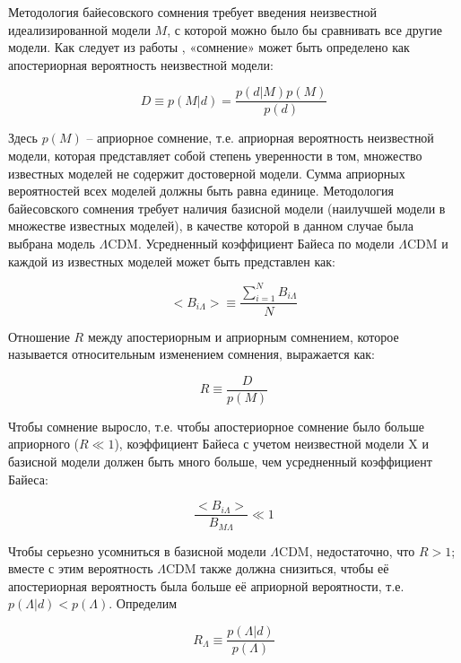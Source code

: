 Методология байесовского сомнения требует введения неизвестной идеализированной модели $M$, с которой можно было бы 
сравнивать все другие модели. Как следует из работы \cite{starkman2008introducing}, «сомнение» может быть определено 
как апостериорная вероятность неизвестной модели:

\begin{equation}
 D \equiv p(M|d) = \frac{p(d|M)p(M)}{p(d)}
\end{equation}

Здесь $p(M)$ – априорное сомнение, т.е. априорная вероятность неизвестной модели, которая представляет собой степень 
уверенности в том, множество известных моделей не содержит достоверной модели. Сумма априорных вероятностей всех 
моделей должны быть равна единице. Методология байесовского сомнения требует наличия базисной модели (наилучшей модели 
в множестве известных моделей), в качестве которой в данном случае была выбрана модель $\Lambda$CDM. Усредненный 
коэффициент Байеса по модели $\Lambda$CDM и каждой из известных моделей может быть представлен как:

\begin{equation}
<B_{i\Lambda}> \equiv \frac{\sum_{i=1}^N B_{i\Lambda}}{N}
\end{equation}

Отношение $R$  между апостериорным и априорным сомнением, которое называется относительным изменением сомнения, 
выражается как:

\begin{equation}
R \equiv \frac{D}{p(M)}
\end{equation}

Чтобы сомнение выросло, т.е. чтобы апостериорное сомнение было больше априорного ($R \ll 1$), коэффициент Байеса 
с учетом неизвестной модели X и базисной модели должен быть много больше, чем усредненный коэффициент Байеса:

\begin{equation}
\frac{<B_{i\Lambda}>}{B_{M\Lambda}} \ll 1
\end{equation}

Чтобы серьезно усомниться в базисной модели $\Lambda$CDM, недостаточно, что $R > 1$; вместе с этим вероятность 
$\Lambda$CDM также должна снизиться, чтобы её апостериорная вероятность была больше её априорной вероятности, т.е. 
$p(\Lambda|d) < p(\Lambda)$. Определим

\begin{equation}
R_\Lambda \equiv \frac{p(\Lambda|d)}{p(\Lambda)}
\end{equation}

